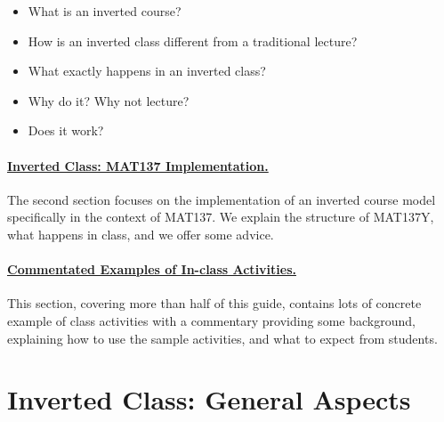 \documentclass[11pt]{article}
\begin{document}
	\begin{itemize}
		\item What is an inverted course?
			\vspace{-1mm}

		\item How is an inverted class different from a traditional lecture?
			\vspace{-1mm}

		\item What exactly happens in an inverted class?
			\vspace{-1mm}

		\item Why do it? Why not lecture?
			\vspace{-1mm}

		\item Does it work?
	\end{itemize}

	\paragraph{\hyperref[sec:structure]{Inverted Class: MAT137 Implementation.}}
	The second section focuses on the implementation of an inverted course model specifically
	in the context of MAT137. We explain the structure of MAT137Y, what happens in
	class, and we offer some advice.

	\paragraph{\hyperref[sec:activities]{Commentated Examples of In-class
	Activities.}}
	This section, covering more than half of this guide, contains lots of concrete
	example of class activities with a commentary providing some background,
	explaining how to use the sample activities, and what to expect from students.

	\tableofcontents

	\newpage

	\renewcommand{\baselinestretch}{1.3} %


	\section[1. Inverted Class: General Aspects]{Inverted Class: General Aspects}
	\label{sec:general}

\end{document}
